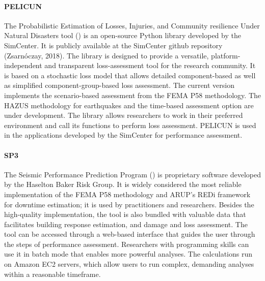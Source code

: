\paragraph{PELICUN} The Probabilistic Estimation of Losses, Injuries, and Community resilience Under Natural Disasters tool () is an open-source Python library developed by the SimCenter. It is publicly available at the SimCenter github repository (Zsarnóczay, 2018). The library is designed to provide a versatile, platform-independent and transparent loss-assessment tool for the research community. It is based on a stochastic loss model that allows detailed component-based as well as simplified component-group-based loss assessment. The current version implements the scenario-based assessment from the FEMA P58 methodology. The HAZUS methodology for earthquakes and the time-based assessment option are under development. The library allows researchers to work in their preferred environment and call its functions to perform loss assessment. PELICUN is used in the applications developed by the SimCenter for performance assessment.

\paragraph{SP3} The Seismic Performance Prediction Program () is proprietary software developed by the Haselton Baker Risk Group. It is widely considered the most reliable implementation of the FEMA P58 methodology and ARUP's REDi framework for downtime estimation; it is used by practitioners and researchers. Besides the high-quality implementation, the tool is also bundled with valuable data that facilitates building response estimation, and damage and loss assessment. The tool can be accessed through a web-based interface that guides the user through the steps of performance assessment. Researchers with programming skills can use it in batch mode that enables more powerful analyses. The calculations run on Amazon EC2 servers, which allow users to run complex, demanding analyses within a reasonable timeframe.

